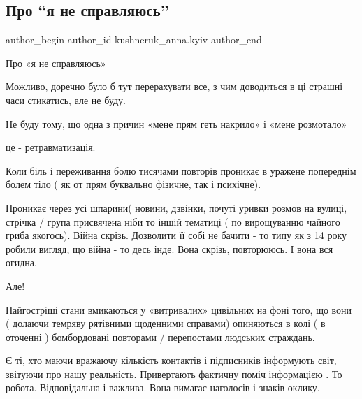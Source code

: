  
 
 
 
 

\subsection{Про \enquote{я не справляюсь}}
\label{sec:17_01_2023.fb.kushneruk_anna.kyiv.1.pro__ya_ne_spravlyay}

\ifcmt
 author_begin
   author_id kushneruk_anna.kyiv
 author_end
\fi

Про «я не справляюсь» 

Можливо, доречно було  б тут перерахувати все, з чим доводиться в ці страшні
часи стикатись, але не буду. 

Не буду  тому, що одна з причин «мене прям геть накрило» і «мене розмотало»

це - ретравматизація. 

Коли біль і переживання болю тисячами повторів проникає в уражене попереднім
болем тіло  ( як от прям буквально фізичне, так і психічне). 

Проникає через усі шпарини( новини, дзвінки, почуті уривки розмов на вулиці,
стрічка / група присвячена ніби то іншій тематиці ( по вирощуванню чайного
гриба якогось). Війна скрізь. Дозволити її собі не бачити - то типу як з 14
року робили вигляд, що війна - то десь інде. Вона скрізь, повторююсь. І вона
вся огидна. 

Але!

Найгостріші стани вмикаються у «витривалих» цивільних на фоні  того, що вони (
долаючи темряву рятівними щоденними  справами) опиняються в колі ( в оточенні )
бомбордовані повторами / перепостами людських страждань. 

Є ті, хто маючи вражаючу кількість контактів і підписників інформують світ,
звітуючи про нашу реальність. Привертають фактичну поміч інформацією . То
робота. Відповідальна і важлива. Вона вимагає наголосів і знаків оклику. 

